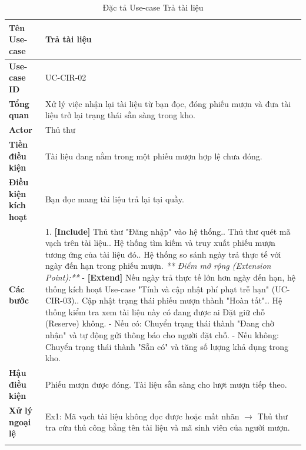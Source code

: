 \begin{longtable}{|p{3.5cm}|p{11.5cm}|}
    \hline
    \textbf{Tên Use-case} & \textbf{Trả tài liệu} \\
    \hline
    \textbf{Use-case ID} & UC-CIR-02 \\
    \hline
    \textbf{Tổng quan} & Xử lý việc nhận lại tài liệu từ bạn đọc, đóng phiếu mượn và đưa tài liệu trở lại trạng thái sẵn sàng trong kho. \\
    \hline
    \textbf{Actor} & Thủ thư \\
    \hline
    \textbf{Tiền điều kiện} & Tài liệu đang nằm trong một phiếu mượn hợp lệ chưa đóng. \\
    \hline
    \textbf{Điều kiện kích hoạt} & Bạn đọc mang tài liệu trả lại tại quầy. \\
    \hline
    \textbf{Các bước} & 
    1. \textbf{[Include]} Thủ thư "Đăng nhập" vào hệ thống.\newline
    2. Thủ thư quét mã vạch trên tài liệu.\newline
    3. Hệ thống tìm kiếm và truy xuất phiếu mượn tương ứng của tài liệu đó.\newline
    4. Hệ thống so sánh ngày trả thực tế với ngày đến hạn trong phiếu mượn.\newline
    \textit{** Điểm mở rộng (Extension Point):**}\newline
    - \textbf{[Extend]} Nếu ngày trả thực tế lớn hơn ngày đến hạn, hệ thống kích hoạt Use-case "Tính và cập nhật phí phạt trễ hạn" (UC-CIR-03).\newline
    5. Cập nhật trạng thái phiếu mượn thành "Hoàn tất".\newline
    6. Hệ thống kiểm tra xem tài liệu này có đang được ai Đặt giữ chỗ (Reserve) không.\newline
    - Nếu có: Chuyển trạng thái thành "Đang chờ nhận" và tự động gửi thông báo cho người đặt chỗ.\newline
    - Nếu không: Chuyển trạng thái thành "Sẵn có" và tăng số lượng khả dụng trong kho. \\
    \hline
    \textbf{Hậu điều kiện} & Phiếu mượn được đóng. Tài liệu sẵn sàng cho lượt mượn tiếp theo. \\
    \hline
    \textbf{Xử lý ngoại lệ} & 
    Ex1: Mã vạch tài liệu không đọc được hoặc mất nhãn $\rightarrow$ Thủ thư tra cứu thủ công bằng tên tài liệu và mã sinh viên của người mượn. \\
    \hline
    \caption{Đặc tả Use-case Trả tài liệu}
\end{longtable}

